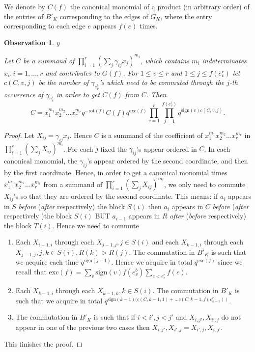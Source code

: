 \documentclass{amsart}
\theoremstyle{plain}
\newtheorem{observation}{Observation}
\theoremstyle{definition}
\theoremstyle{remark}
\def\printname#1{
        \if\draft y
                \smash{\makebox[0pt]{\hspace{-0.5in}
                        \raisebox{8pt}{\tt\tiny #1}}}
        \fi
}
\def\lbl#1{\label{#1}\printname{#1}}
\def\rot{\mathrm{rot}}
\def\sign{\mathrm{sign}}
\def\exc{\mathrm{exc}}
\begin{document}
We denote by $C(f)$ the canonical monomial of a product 
(in arbitrary order) of the entries of $B'_K$
corresponding to the edges of $G_K$, where the entry corresponding to 
each edge $e$
appears $f(e)$ times.

\begin{observation}
\lbl{obs.hr}
Let $C$ be a summand of $\prod_{i=1}^r(\sum_{j}\gamma_{ij}x_j)^{m_i}$, which 
contains $m_i$ indeterminates $x_i, i=1,\dots, r$ and contributes to $G(f)$.
For $1\leq v\leq r$ and $1\leq j\leq f(e^r_v)$ let $c(C,v,j)$ be the 
number of $\gamma_{e^b_v}$'s 
which need to be commuted through the $j$-th occurrence of $\gamma_{e^r_v}$ 
in order to get
$C(f)$ from $C$.
Then
$$
C= x_1^{m_1}x_2^{m_2}\dots x_r^{m_r}q^{-\rot(f)}C(f)q^{\exc(f)}
\prod_{v=1}^r\prod_{j=1}^{f(e^r_v)}
q^{\sign(v)c(C,v,j)}.
$$
\end{observation}
\begin{proof}
Let $X_{ij}= \gamma_{ij}x_j$. Hence $C$ is a summand of the coefficient of 
$x_1^{m_1}x_2^{m_2}\dots x_r^{m_r}$ in $\prod_{i=1}^r(\sum_{j}X_{ij})^{m_i}$. 
For each $j$ fixed the $\gamma_{ij}$'s appear ordered in $C$.
In each canonical monomial, the $\gamma_{ij}$'s appear ordered by the 
second coordinate, and then by the 
first coordinate. Hence, in order to get a canonical monomial times 
$x_1^{m_1}x_2^{m_2}\dots x_r^{m_r}$ from a summand of 
$\prod_{i=1}^r(\sum_{j}X_{ij})^{m_i}$,
we only need to commute $X_{ij}$'s so that they are ordered by the 
second coordinate.
This means: if $a_i$ appears in $S$ {\it before} ({\it after} respectively)
the block $S(i)$ 
then $a_i$ appears in $C$ {\it before} ({\it after} respectively )the 
block $S(i)$ 
BUT $a_{i-1}$ appears in $R$ {\it after} ({\it before} respectively) 
the block $T(i)$. Hence 
we need to commute 
\begin{enumerate}
\item[1.]
Each $X_{i-1,i}$ through each $X_{j-1,j}, j\in S(i)$ and
each $X_{k-1,i}$ through each  $X_{j-1,j}, j,k\in S(i), R(k)>R(j)$.
The commutation in $B'_K$ is such that we acquire each time $q^{\sign(j-1)}$.
Hence we acquire in total $q^{\exc(f)}$ since we recall that
$\exc(f)=\sum_{v} \sign(v) f(e^b_v) \sum_{e< e^r_v}f(e)$.
\item[2.]
Each $X_{k-1,i}$ through each  $X_{k-1,k}, k\in S(i)$. The commutation in 
$B'_K$ is such that 
we acquire  in total
$q^{\sign(k-1)(c(C,k-1,1)+\dots c(C,k-1,f(e^r_{k-1}))}$. 
\item[3.]
 The commutation in $B'_K$ is such that if $i<i', j<j'$ and $X_{i,j'},
X_{i',j}$ do not
appear in one of the previous two cases then $X_{i,j'},X_{i',j}= X_{i',j},
X_{i,j'}$.
\end{enumerate}
This finishes the proof.
\end{proof}
\end{document}

